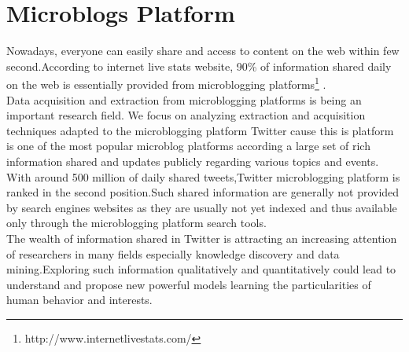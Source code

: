 \section{Microblogs Platform}
Nowadays, everyone can easily share and access to content on the web within few second.According to internet live stats website, 90\% of information shared daily on the web is essentially provided from microblogging platforms\footnote{http://www.internetlivestats.com/} .
\\Data acquisition and extraction from microblogging platforms is being an important research field. We focus on analyzing extraction and acquisition techniques adapted to the microblogging platform Twitter cause this is platform is one of the most popular microblog platforms according a large set of rich information shared and updates publicly regarding various topics and events.
\\With around 500 million of daily shared tweets,Twitter microblogging platform is ranked in the second position.Such shared information are generally not provided by search engines websites as they are usually not yet indexed and thus available only through the microblogging platform search tools.
\\The wealth of information shared in Twitter is attracting an increasing attention of researchers in many fields especially knowledge discovery and data mining.Exploring such information qualitatively and quantitatively could lead to understand and propose new powerful models learning the particularities of human behavior and interests.
